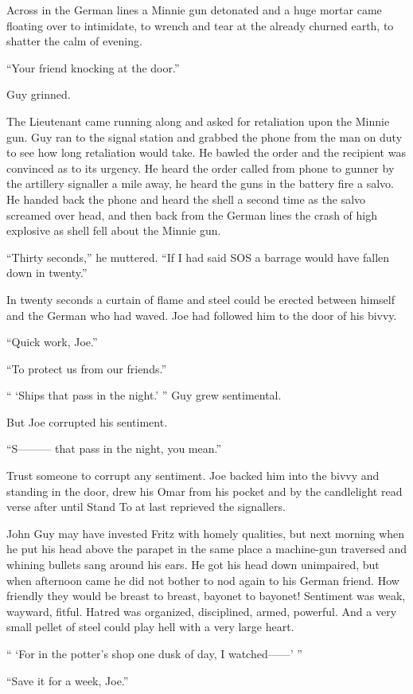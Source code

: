 Across in the German lines a Minnie gun detonated and a huge mortar came floating over to intimidate, to wrench and tear at the already churned earth, to shatter the calm of evening.

``Your friend knocking at the door.''

Guy grinned.

The Lieutenant came running along and asked for retaliation upon the Minnie gun. Guy ran to the signal station and grabbed the phone from the man on duty to see how long retaliation would take. He bawled the order and the recipient was convinced as to its urgency. He heard the order called from phone to gunner by the artillery signaller a mile away, he heard the guns in the battery fire a salvo. He handed back the phone and heard the shell a second time as the salvo screamed over head, and then back from the German lines the crash of high explosive as shell fell about the Minnie gun.

``Thirty seconds,'' he muttered. ``If I had said SOS a barrage would have fallen down in twenty.''

In twenty seconds a curtain of flame and steel could be erected between himself and the German who had waved. Joe had followed him to the door of his bivvy.

``Quick work, Joe.''

``To protect us from our friends.''

`` `Ships that pass in the night.' '' Guy grew sentimental.

But Joe corrupted his sentiment.

``S--------- that pass in the night, you mean.''

Trust someone to corrupt any sentiment. Joe backed him into the bivvy and standing in the door, drew his Omar from his pocket and by the candlelight read verse after until Stand To at last reprieved the signallers.

John Guy may have invested Fritz with homely qualities, but next morning when he put his head above the parapet in the same place a machine-gun traversed and whining bullets sang around his ears. He got his head down unimpaired, but when afternoon came he did not bother to nod again to his German friend. How friendly they would be breast to breast, bayonet to bayonet! Sentiment was weak, wayward, fitful. Hatred was organized, disciplined, armed, powerful. And a very small pellet of steel could play hell with a very large heart.

`` `For in the potter's shop one dusk of day, I watched------' ''

``Save it for a week, Joe.''
